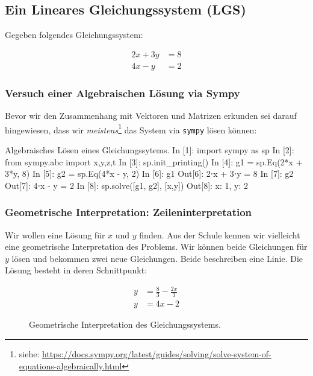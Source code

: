 \subsection*{Ein Lineares Gleichungssystem (LGS)}

Gegeben folgendes Gleichungssystem:

\[
\begin{aligned}
2x + 3y &= 8 \\
4x -  y &= 2
\end{aligned}
\]

\subsubsection{Versuch einer Algebraischen Lösung via Sympy}
Bevor wir den Zusammenhang mit Vektoren und Matrizen erkunden sei darauf hingewiesen, dass wir \emph{meistens}\footnote{siehe: \href{https://docs.sympy.org/latest/guides/solving/solve-system-of-equations-algebraically.html}{https://docs.sympy.org/latest/guides/solving/solve-system-of-equations-algebraically.html}} das System via \texttt{sympy} lösen können: 
\begin{python}{Algebraisches Lösen eines Gleichungssytems.}
In [1]: import sympy as sp
In [2]: from sympy.abc import x,y,z,t
In [3]: sp.init_printing()
In [4]: g1 = sp.Eq(2*x + 3*y, 8)
In [5]: g2 = sp.Eq(4*x - y, 2)
In [6]: g1
Out[6]: 2⋅x + 3⋅y = 8
In [7]: g2
Out[7]: 4⋅x - y = 2
In [8]: sp.solve([g1, g2], [x,y])
Out[8]: {x: 1, y: 2}
\end{python}

\subsubsection{Geometrische Interpretation: Zeileninterpretation}
 Wir wollen eine Lösung für $x$ und $y$ finden. Aus der Schule kennen wir vielleicht eine geometrische Interpretation des Problems. Wir können beide Gleichungen für $y$ lösen und bekommen zwei neue Gleichungen. Beide beschreiben eine Linie. Die Lösung besteht in deren Schnittpunkt:

\[
\begin{aligned}
y &= \frac{8}{3} - \frac{2 x}{3} \\
y &= 4 x - 2 
\end{aligned}
\]


\begin{figure}[H]
    \centering
    
    \caption{Geometrische Interpretation des Gleichungssystems.}
    \label{fig:lgs_geom}
\end{figure}

